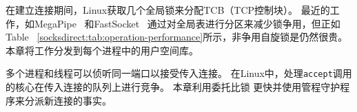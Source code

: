 在建立连接期间，Linux获取几个全局锁来分配TCB（TCP控制块）。
最近的工作，如MegaPipe~ \cite {han2012megapipe}和FastSocket~ \cite {lin2016scalable}通过对全局表进行分区来减少锁争用，但正如Table~ \ref {socksdirect:tab:operation-performance}所示，非争用自旋锁是仍然很贵。
本章将工作分发到每个进程中的用户空间库\libipc {}。

多个进程和线程可以侦听同一端口以接受传入连接。
在Linux中，处理\texttt {accept}调用的核心在传入连接的队列上进行竞争。
本章利用委托比锁 \cite {roghanchi2017ffwd}更快并使用管程守护程序来分派新连接的事实。








